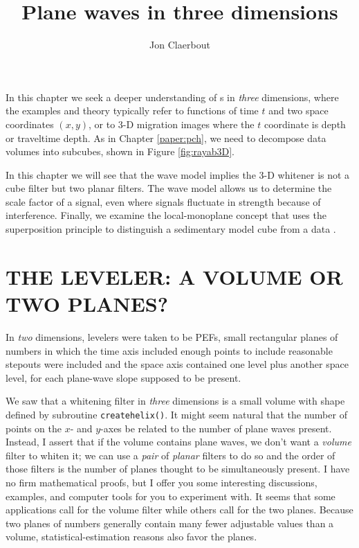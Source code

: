 
\title{Plane waves in three dimensions}
\author{Jon Claerbout}
\label{paper:lmn}
\maketitle

In this chapter we seek a deeper understanding
of s in {\it three} dimensions,
where the examples and theory typically refer to functions
of time $t$ and two space coordinates $(x,y)$,
or to 3-D migration images where the $t$
coordinate is depth or traveltime depth.
As in Chapter \ref{paper:pch},
we need to decompose data volumes into subcubes,
shown in Figure \ref{fig:rayab3D}.

\par
In this chapter we will see that
the wave model implies the 3-D whitener is not a cube filter
but two planar filters.
The wave model allows us to determine
the scale factor of a signal,
even where signals fluctuate in strength because of interference.
Finally, we examine the local-monoplane concept
that uses the superposition principle
to distinguish a sedimentary model cube from a data .

\section{THE LEVELER:  A VOLUME OR TWO PLANES?}
\par
In {\it two} dimensions,
levelers were taken to be PEFs,
small rectangular planes of numbers in which the time axis
included enough points to include reasonable stepouts were included
and the space axis contained one level plus another space level,
for each plane-wave slope supposed to be present.
\par
We saw that a whitening filter in {\it three} dimensions
is a small volume with shape defined by subroutine 
\texttt{createhelix()}.
It might seem natural that the number of points on the $x$-
and $y$-axes be related to the number of plane waves present.
Instead, I assert that if the volume contains plane waves,
we don't want a {\it volume} filter to whiten it;
we can use a {\it pair} of {\it planar} filters to do so
and the order of those filters is the number of planes
thought to be simultaneously present.
I have no firm mathematical proofs,
but I offer you some interesting discussions, examples,
and computer tools for you to experiment with.
It seems that some applications call for the volume filter
while others call for the two planes.
Because two planes of numbers generally contain
many fewer adjustable values than a volume,
statistical-estimation reasons also favor the planes.

